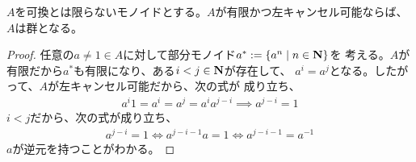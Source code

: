 	\begin{proposition}[キャンセル可能な有限モノイドは群]
	\label{prop:キャンセル可能な有限モノイドは群} %
		$A$を可換とは限らないモノイドとする。$A$が有限かつ左キャンセル可能ならば、
		$A$は群となる。\EOP
	\end{proposition} %
	\begin{proof} %
		任意の$a\neq1\in A$に対して部分モノイド$a^*:=\mathinner{\{{a^n\mid n\in\ensuremath{\mathbf{N}}}\}}$を
		考える。$A$が有限だから$a^*$も有限になり、ある$i<j\in\mathbf{N}$が存在して、
		$a^i=a^j$となる。したがって、$A$が左キャンセル可能だから、次の式が
		成り立ち、
		\begin{equation*}\begin{split}
			a^i1 = a^i = a^j = a^ia^{j-i} \implies a^{j-i}=1
		\end{split}\end{equation*}
		$i<j$だから、次の式が成り立ち、
		\begin{equation*}\begin{split}
			a^{j-i}=1 \iff a^{j-i-1}a = 1\iff a^{j-i-1} = a^{-1}
		\end{split}\end{equation*}
		$a$が逆元を持つことがわかる。
	\end{proof} %
